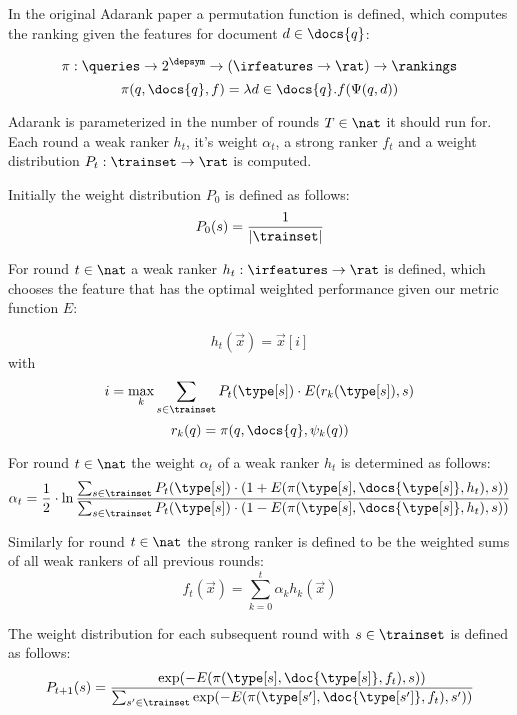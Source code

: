 \begin{definition}
  In the original Adarank paper \cite{xu2007adarank} a permutation function is defined,
  which computes the ranking given the features for document $d \in \docs{q}$:

  \[ \pi : \queries \rightarrow 2^\depsym \rightarrow (\irfeatures \rightarrow \rat) \rightarrow \rankings \]
  \[ \pi(q, \docs{q}, f) = \lambda d \in \docs{q} . f(\Psi(q, d)) \]
\end{definition}

Adarank is parameterized in the number of rounds $T \in \nat$ it should run for.
Each round a weak ranker $h_t$, it's weight $\alpha_t$, a strong ranker $f_t$
and a weight distribution $P_t : \trainset \rightarrow \rat$ is computed.

\begin{definition}
  Initially the weight distribution $P_0$ is defined as follows:
  $$ P_0(s) = \frac{1}{|\trainset|} $$
\end{definition}

\begin{definition}
  For round $t \in \nat$ a weak ranker $h_t : \irfeatures \rightarrow \rat$ is defined, which chooses the feature
  that has the optimal weighted performance given our metric function $E$:

  $$ h_t(\vec{x}) = \vec{x}[i] $$
  with $$ i = \max_k \sum_{s \in \trainset} P_t(\type[s]) \cdot E(r_k(\type[s]), s) $$
  $$ r_k(q) = \pi(q, \docs{q}, \psi_k(q)) $$
\end{definition}

\begin{definition}
  For round $t \in \nat$ the weight $\alpha_t$ of a weak ranker $h_t$ is determined as follows:
  \[
    \alpha_t = \frac{1}{2} \cdot \ln \frac{
      \sum_{s \in \trainset} P_t(\type[s]) \cdot ( 1 + E(\pi(\type[s], \docs{\type[s]}, h_t), s) )
    }{
      \sum_{s \in \trainset} P_t(\type[s]) \cdot ( 1 - E(\pi(\type[s], \docs{\type[s]}, h_t), s) )
    }
  \]
\end{definition}

\begin{definition}
  Similarly for round $t \in \nat$ the strong ranker is defined to be the weighted
  sums of all weak rankers of all previous rounds:
  $$ f_t(\vec{x}) = \sum_{k=0}^{t} \alpha_k h_k(\vec{x}) $$
\end{definition}

\begin{definition}
  The weight distribution for each subsequent round with $s \in \trainset$ is defined as follows:
  $$
    P_{t+1}(s) = \frac{
      \exp(- E(\pi(\type[s], \doc{\type[s]}, f_t), s))
    }{
      \sum_{s' \in \trainset} \exp(- E(\pi(\type[s'], \doc{\type[s']}, f_t), s'))
    }
  $$
\end{definition}

